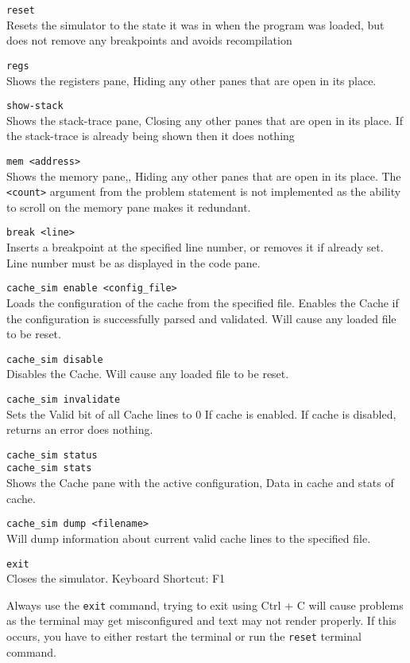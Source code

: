 \documentclass[12pt]{article}
\begin{document}
	\verb|reset|\\
	Resets the simulator to the state it was in when the program was loaded, but does not remove any breakpoints and avoids recompilation

	\verb|regs|\\
	Shows the registers pane, Hiding any other panes that are open in its place.

	\verb|show-stack|\\
	Shows the stack-trace pane, Closing any other panes that are open in its place. If the stack-trace is already being shown then it does nothing

	\verb|mem <address>|\\
	Shows the memory pane,, Hiding any other panes that are open in its place. The \verb|<count>| argument from the problem statement is not implemented as the ability to scroll on the memory pane makes it redundant.

	\verb|break <line>|\\
	Inserts a breakpoint at the specified line number, or removes it if already set. Line number must be as displayed in the code pane.

	\verb|cache_sim enable <config_file>|\\
	Loads the configuration of the cache from the specified file. Enables the Cache if the configuration is successfully parsed and validated. Will cause any loaded file to be reset.

	\verb|cache_sim disable|\\
	Disables the Cache. Will cause any loaded file to be reset.

	\verb|cache_sim invalidate|\\
	Sets the Valid bit of all Cache lines to 0 If cache is enabled. If cache is disabled, returns an error does nothing.

	\verb|cache_sim status|\\
	\verb|cache_sim stats|\\
	Shows the Cache pane with the active configuration, Data in cache and stats of cache.

	\verb|cache_sim dump <filename>|\\
	Will dump information about current valid cache lines to the specified file.

	\verb|exit|\\
	Closes the simulator. Keyboard Shortcut: F1
	
	Always use the \verb|exit| command, trying to exit using Ctrl + C will cause problems as the terminal may get misconfigured and text may not render properly. If this occurs, you have to either restart the terminal or run the \verb|reset| terminal command.
\end{document}
